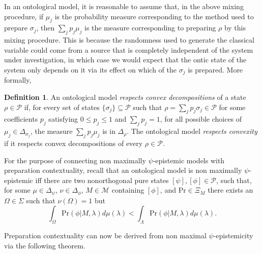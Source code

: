 \documentclass[DIV=calc,fontsize=12pt]{scrartcl} %
\theoremstyle{definition}
\newtheorem{definition}{Definition}[section]
\theoremstyle{plain}
\newcommand{\Proj}[1]{\ensuremath{\left [ #1 \right ]}}
\begin{document}
In an ontological model, it is reasonable to assume that, in the above
mixing procedure, if $\mu_j$ is the probability measure corresponding
to the method used to prepare $\sigma_j$, then $\sum_j p_j \mu_j$ is
the measure corresponding to preparing $\rho$ by this mixing
procedure.  This is because the randomness used to generate the
classical variable could come from a source that is completely
independent of the system under investigation, in which case we would
expect that the ontic state of the system only depends on it via its
effect on which of the $\sigma_j$ is prepared.  More formally,

\begin{definition}
An ontological model \emph{respects convex decompositions} of a
state $\rho \in \mathcal{P}$ if, for every set of states
$\{\sigma_j\} \subseteq \mathcal{P}$ such that $\rho = \sum_j p_j
\sigma_j \in \mathcal{P}$ for some coefficients $p_j$ satisfying $0
\leq p_j \leq 1$ and $\sum_j p_j = 1$, for all possible choices of
$\mu_j \in \Delta_{\sigma_j}$, the measure $\sum_j p_j \mu_j$ is in
$\Delta_{\rho}$.  The ontological model \emph{respects convexity} if
it respects convex decompositions of every $\rho \in \mathcal{P}$.
\end{definition}

For the purpose of connecting non maximally $\psi$-epistemic models
with preparation contextuality, recall that an ontological model is
non maximally $\psi$-epistemic iff there are two nonorthogonal pure
states $\Proj{\psi}, \Proj{\phi} \in \mathcal{P}$, such that, for some
$\mu \in \Delta_{\psi}$, $\nu \in \Delta_{\phi}$, $M \in \mathcal{M}$
containing $\Proj{\phi}$, and $\text{Pr} \in \Xi_M$ there exists an
$\Omega \in \Sigma$ such that $\nu(\Omega) = 1$ but
\begin{equation}
\label{eq:PC:nME}
\int_{\Omega} \text{Pr}(\phi|M,\lambda)d\mu(\lambda) < \int_{\Lambda}
\text{Pr}(\phi|M,\lambda)d\mu(\lambda).
\end{equation}

Preparation contextuality can now be derived from non maximal
$\psi$-epistemicity via the following theorem.
\end{document}
